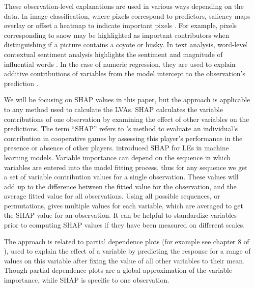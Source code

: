 \documentclass[
]{jss}
\begin{document}
These observation-level explanations are used in various ways depending
on the data. In image classification, where pixels correspond to
predictors, saliency maps overlay or offset a heatmap to indicate
important pixels \citep{simonyan_deep_2014}. For example, pixels
corresponding to snow may be highlighted as important contributors when
distinguishing if a picture contains a coyote or husky. In text
analysis, word-level contextual sentiment analysis highlights the
sentiment and magnitude of influential words \citep{vanni_textual_2018}.
In the case of numeric regression, they are used to explain additive
contributions of variables from the model intercept to the observation's
prediction \citep{ribeiro_why_2016}.

We will be focusing on SHAP values in this paper, but the approach is
applicable to any method used to calculate the LVAs. SHAP calculates the
variable contributions of one observation by examining the effect of
other variables on the predictions. The term ``SHAP'' refers to
\citet{shapley_value_1953}'s method to evaluate an individual's
contribution in cooperative games by assessing this player's performance
in the presence or absence of other players.
\citet{strumbelj_efficient_2010} introduced SHAP for LEs in machine
learning models. Variable importance can depend on the sequence in which
variables are entered into the model fitting process, thus for any
sequence we get a set of variable contribution values for a single
observation. These values will add up to the difference between the
fitted value for the observation, and the average fitted value for all
observations. Using all possible sequences, or permutations, gives
multiple values for each variable, which are averaged to get the SHAP
value for an observation. It can be helpful to standardize variables
prior to computing SHAP values if they have been measured on different
scales.

The approach is related to partial dependence plots (for example see
chapter 8 of \citet{molnar2022}), used to explain the effect of a
variable by predicting the response for a range of values on this
variable after fixing the value of all other variables to their mean.
Though partial dependence plots are a global approximation of the
variable importance, while SHAP is specific to one observation.
\end{document}
